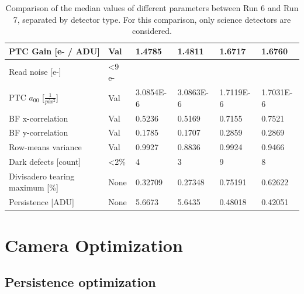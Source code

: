 \begin{table}[ht]
{\begin{tabular}{|l|l|ll|ll|}
PTC Gain {[}e- / ADU{]}            & Val               & \multicolumn{1}{l|}{1.4785}    & 1.4811    & \multicolumn{1}{l|}{1.6717}    & 1.6760     \\ \hline
Read noise {[}e-{]}            & <9 e-               & \multicolumn{1}{l|}{}    &     & \multicolumn{1}{l|}{}    &      \\ \hline
PTC $a_{00}$ [$\frac{1}{pix^2}$]   & Val               & \multicolumn{1}{l|}{3.0854E-6} & 3.0863E-6 & \multicolumn{1}{l|}{1.7119E-6} & 1.7031E-6  \\ \hline
BF x-correlation                   & Val               & \multicolumn{1}{l|}{0.5236}    & 0.5169    & \multicolumn{1}{l|}{0.7155}    & 0.7521     \\ \hline
BF y-correlation                   & Val               & \multicolumn{1}{l|}{0.1785}    & 0.1707    & \multicolumn{1}{l|}{0.2859}    & 0.2869     \\ \hline
Row-means variance                 & Val               & \multicolumn{1}{l|}{0.9927}    & 0.8836    & \multicolumn{1}{l|}{0.9924}    & 0.9466     \\ \hline
Dark defects {[}count{]}           & <2\%               & \multicolumn{1}{l|}{4} & 3 & \multicolumn{1}{l|}{9} & 8  \\ \hline
Divisadero tearing maximum {[}\%{]}& None               & \multicolumn{1}{l|}{0.32709}   & 0.27348   & \multicolumn{1}{l|}{0.75191}   & 0.62622    \\ \hline
Persistence {[}ADU{]}              & None               & \multicolumn{1}{l|}{5.6673}    & 5.6435    & \multicolumn{1}{l|}{0.48018}   & 0.42051    \\ \hline
\end{tabular}
}
\caption{Comparison of the median values of different parameters between Run 6 and Run 7, separated by detector type. For this comparison, only science detectors are considered.}
\end{table}

\clearpage

\section{Camera Optimization}\label{sec:camera-optimization}

\subsection{Persistence optimization}\label{sec:persistence-optimization}


